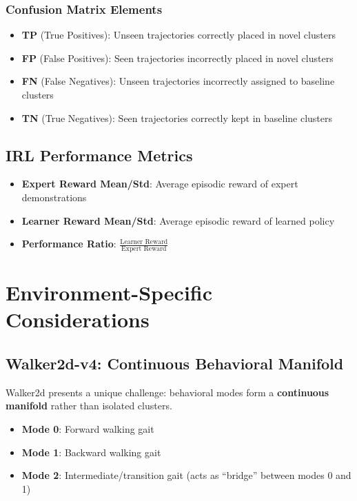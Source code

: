 \documentclass{article}
\begin{document}
\subsubsection{Confusion Matrix Elements}

\begin{itemize}
    \item \textbf{TP} (True Positives): Unseen trajectories correctly placed in novel clusters
    \item \textbf{FP} (False Positives): Seen trajectories incorrectly placed in novel clusters
    \item \textbf{FN} (False Negatives): Unseen trajectories incorrectly assigned to baseline clusters
    \item \textbf{TN} (True Negatives): Seen trajectories correctly kept in baseline clusters
\end{itemize}

\subsection{IRL Performance Metrics}

\begin{itemize}
    \item \textbf{Expert Reward Mean/Std}: Average episodic reward of expert demonstrations
    \item \textbf{Learner Reward Mean/Std}: Average episodic reward of learned policy
    \item \textbf{Performance Ratio}: $\frac{\text{Learner Reward}}{\text{Expert Reward}}$
\end{itemize}

\section{Environment-Specific Considerations}

\subsection{Walker2d-v4: Continuous Behavioral Manifold}

Walker2d presents a unique challenge: behavioral modes form a \textbf{continuous manifold} rather than isolated clusters.

\begin{itemize}
    \item \textbf{Mode 0}: Forward walking gait
    \item \textbf{Mode 1}: Backward walking gait  
    \item \textbf{Mode 2}: Intermediate/transition gait (acts as ``bridge'' between modes 0 and 1)
\end{itemize}
\end{document}
